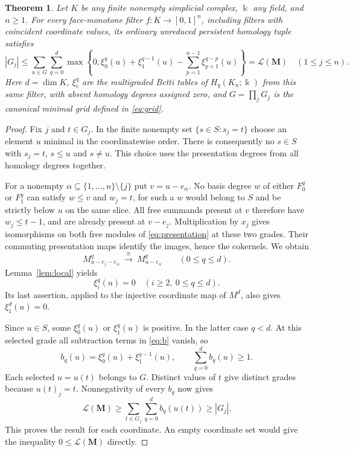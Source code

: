 \documentclass[11pt]{article}
\newtheorem{theorem}{Theorem}
\newcommand{\kk}{\Bbbk}
\newcommand{\LL}{\mathcal L}
\begin{document}
\begin{theorem}\label{thm:main}
Let $K$ be any finite nonempty simplicial complex, $\kk$ any field,
and $n\ge1$. For every face-monotone filter $f:K\to[0,1]^n$,
including filters with coincident coordinate values, its ordinary
unreduced persistent homology tuple satisfies
\[
 |G_j|\le
 \sum_{u\in G}\sum_{q=0}^{d}
 \max\left\{0,\xi_0^q(u)+\xi_1^{q-1}(u)
             -\sum_{p=1}^{n-1}\xi_{p+1}^{q-p}(u)\right\}
 =\LL(\mathbf M)
 \quad (1\le j\le n).
\]
Here $d=\dim K$, $\xi_i^q$ are the multigraded Betti tables of
$H_q(K_u;\kk)$ from this same filter, with absent homology degrees
assigned zero, and $G=\prod_jG_j$ is the canonical minimal grid
defined in \eqref{eq:grid}.
\end{theorem}

\begin{proof}
Fix $j$ and $t\in G_j$. In the finite nonempty set
$\{s\in S:s_j=t\}$ choose an element $u$ minimal in the
coordinatewise order. There is consequently no $s\in S$ with
$s_j=t$, $s\le u$ and $s\ne u$. This choice uses the
presentation degrees from all homology degrees together.

For a nonempty
$\alpha\subseteq\{1,\ldots,n\}\setminus\{j\}$ put
$v=u-e_\alpha$. No basis degree $w$ of either $F_0^q$ or $F_1^q$
can satisfy $w\le v$ and $w_j=t$, for such a $w$ would belong to
$S$ and be strictly below $u$ on the same slice. All free summands
present at $v$ therefore have $w_j\le t-1$, and are already present
at $v-e_j$. Multiplication by $x_j$ gives isomorphisms on both
free modules of \eqref{eq:presentation} at these two grades.
Their commuting presentation maps identify the images, hence the
cokernels. We obtain
\[
 M^q_{u-e_j-e_\alpha}\ \xrightarrow{\ \cong\ }\ M^q_{u-e_\alpha}
 \qquad(0\le q\le d).
\]
Lemma~\ref{lem:local} yields
\[
 \xi_i^q(u)=0\quad(i\ge2,\ 0\le q\le d).
\]
Its last assertion, applied to the injective coordinate map of
$M^d$, also gives $\xi_1^d(u)=0$.

Since $u\in S$, some $\xi_0^q(u)$ or $\xi_1^q(u)$ is positive.
In the latter case $q<d$. At this selected grade all subtraction
terms in \eqref{eq:b} vanish, so
\[
 b_q(u)=\xi_0^q(u)+\xi_1^{q-1}(u),\qquad
 \sum_{q=0}^d b_q(u)\ge1.
\]
Each selected $u=u(t)$ belongs to $G$. Distinct values of $t$ give
distinct grades because $u(t)_j=t$. Nonnegativity of every $b_q$
now gives
\[
 \LL(\mathbf M)
 \ge\sum_{t\in G_j}\sum_{q=0}^d b_q(u(t))
 \ge |G_j|.
\]
This proves the result for each coordinate. An empty coordinate
set would give the inequality $0\le\LL(\mathbf M)$ directly.
\end{proof}
\end{document}
